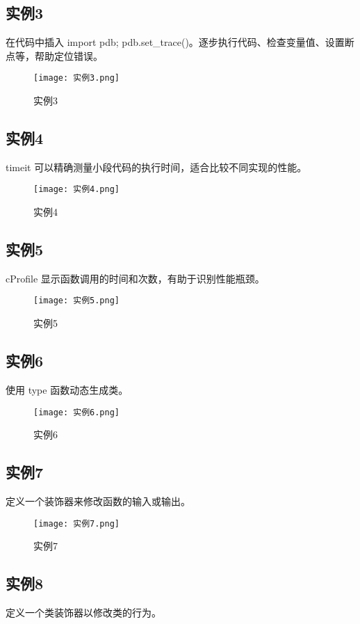 \documentclass[a4paper, 12pt]{article}
\begin{document}
\subsection{实例3}
在代码中插入 import pdb; pdb.set\_trace()。逐步执行代码、检查变量值、设置断点等，帮助定位错误。

\begin{figure}[h!]
  \centering
  \texttt{[image: 实例3.png]}
  \caption{实例3}
\end{figure}

\subsection{实例4}
timeit 可以精确测量小段代码的执行时间，适合比较不同实现的性能。

\begin{figure}[h!]
  \centering
  \texttt{[image: 实例4.png]}
  \caption{实例4}
\end{figure}

\subsection{实例5}
cProfile 显示函数调用的时间和次数，有助于识别性能瓶颈。

\begin{figure}[h!]
  \centering
  \texttt{[image: 实例5.png]}
  \caption{实例5}
\end{figure}

\subsection{实例6}
使用 type 函数动态生成类。

\begin{figure}[h!]
  \centering
  \texttt{[image: 实例6.png]}
  \caption{实例6}
\end{figure}

\subsection{实例7}
定义一个装饰器来修改函数的输入或输出。

\begin{figure}[h!]
  \centering
  \texttt{[image: 实例7.png]}
  \caption{实例7}
\end{figure}

\subsection{实例8}
定义一个类装饰器以修改类的行为。
\end{document}
